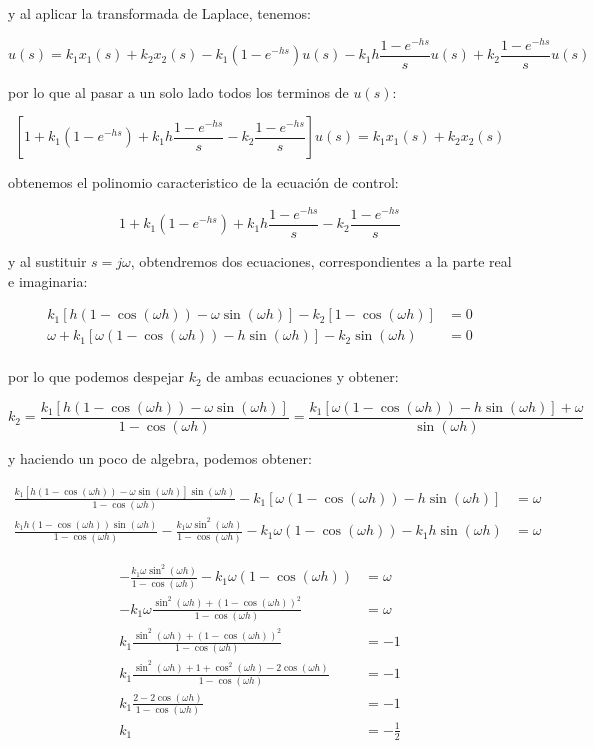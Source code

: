 \documentclass{article}
\begin{document}
y al aplicar la transformada de Laplace, tenemos:

\[
u(s) = k_1 x_1(s) + k_2 x_2(s) - k_1 \left( 1 - e^{-hs} \right) u(s) - k_1 h \frac{1 - e^{-hs}}{s} u(s) + k_2 \frac{1 - e^{-hs}}{s} u(s)
\]

por lo que al pasar a un solo lado todos los terminos de \(u(s)\):

\[
\left[ 1 + k_1 \left( 1 - e^{-hs} \right) + k_1 h \frac{1 - e^{-hs}}{s} - k_2 \frac{1 - e^{-hs}}{s} \right] u(s) = k_1 x_1(s) + k_2 x_2(s)
\]

obtenemos el polinomio caracteristico de la ecuación de control:

\[
1 + k_1 \left( 1 - e^{-hs} \right) + k_1 h \frac{1 - e^{-hs}}{s} - k_2 \frac{1 - e^{-hs}}{s}
\]

y al sustituir \(s = j \omega\), obtendremos dos ecuaciones,
correspondientes a la parte real e imaginaria:

\[
\begin{align}
k_1 \left[ h (1 - \cos{(\omega h)}) - \omega \sin{(\omega h)} \right] - k_2 \left[ 1 - \cos{(\omega h)} \right] &= 0 \\
\omega + k_1 \left[ \omega (1 - \cos{(\omega h)}) - h \sin{(\omega h)} \right] - k_2 \sin{(\omega h)} &= 0 \\
\end{align}
\]

por lo que podemos despejar \(k_2\) de ambas ecuaciones y obtener:

\[
k_2 = \frac{k_1 \left[ h (1 - \cos{(\omega h)}) - \omega \sin{(\omega h)} \right]}{1 - \cos{(\omega h)}} = \frac{k_1 \left[ \omega (1 - \cos{(\omega h)}) - h \sin{(\omega h)} \right] + \omega}{\sin{(\omega h)}}
\]

y haciendo un poco de algebra, podemos obtener:

\[
\begin{align}
\frac{k_1 \left[ h (1 - \cos{(\omega h)}) - \omega \sin{(\omega h)} \right] \sin{(\omega h)}}{1 - \cos{(\omega h)}} - k_1 \left[ \omega (1 - \cos{(\omega h)}) - h \sin{(\omega h)} \right] &= \omega \\
\frac{k_1 h (1 - \cos{(\omega h)}) \sin{(\omega h)}}{1 - \cos{(\omega h)}} - \frac{k_1 \omega \sin^2{(\omega h)}}{1 - \cos{(\omega h)}} - k_1 \omega (1 - \cos{(\omega h)}) - k_1 h \sin{(\omega h)} &= \omega
\end{align}
\]

\[
\begin{align}
- \frac{k_1 \omega \sin^2{(\omega h)}}{1 - \cos{(\omega h)}} - k_1 \omega (1 - \cos{(\omega h)}) &= \omega \\
- k_1 \omega \frac{ \sin^2{(\omega h)} + (1 - \cos{(\omega h)})^2}{1 - \cos{(\omega h)}} &= \omega \\
k_1 \frac{ \sin^2{(\omega h)} + (1 - \cos{(\omega h)})^2}{1 - \cos{(\omega h)}} &= -1 \\
k_1 \frac{ \sin^2{(\omega h)} + 1 + \cos^2{(\omega h)} - 2\cos{(\omega h)}}{1 - \cos{(\omega h)}} &= -1 \\
k_1 \frac{ 2 - 2\cos{(\omega h)}}{1 - \cos{(\omega h)}} &= -1 \\
k_1 &= - \frac{1}{2}
\end{align}
\]
\end{document}
